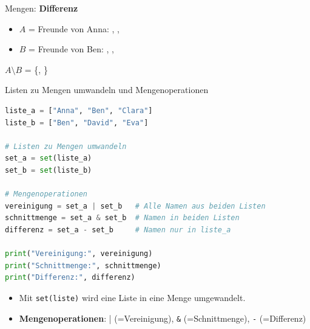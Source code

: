 \begin{frame}[fragile]{Mengen: \textbf{Differenz}}

    \begin{itemize}
        \item $A$ = Freunde von Anna: , , 
        \item $B$ = Freunde von Ben: , , 
    \end{itemize}
    \begin{figure}[H]
        \centering
    \end{figure}
    \begin{center}
        $A \setminus B$ = \{, \}
    \end{center}
\end{frame}

\begin{frame}[fragile]{Listen zu Mengen umwandeln und Mengenoperationen}
    \begin{lstlisting}[language=Python, basicstyle=\ttfamily\footnotesize]
liste_a = ["Anna", "Ben", "Clara"]
liste_b = ["Ben", "David", "Eva"]

# Listen zu Mengen umwandeln
set_a = set(liste_a)
set_b = set(liste_b)

# Mengenoperationen
vereinigung = set_a | set_b   # Alle Namen aus beiden Listen
schnittmenge = set_a & set_b  # Namen in beiden Listen
differenz = set_a - set_b     # Namen nur in liste_a

print("Vereinigung:", vereinigung)
print("Schnittmenge:", schnittmenge)
print("Differenz:", differenz)
    \end{lstlisting}
    \begin{itemize}
        \item Mit \lstinline|set(liste)| wird eine Liste in eine Menge umgewandelt.
        \item \textbf{Mengenoperationen}: \lstinline||| (=Vereinigung), \lstinline|&| (=Schnittmenge), \lstinline|-| (=Differenz)
    \end{itemize}
\end{frame}

